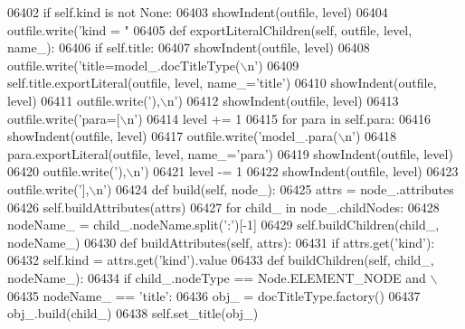 \begin{DoxyCode}
{{{{{{{{{{{{{{{{{{{{{{{{{{{{{{{{{{{{{{{{{{{{{{{{{{{{{{{{{{{{{{{{{{{{{{{{{{{{{{{{{{{{{{{{{{{{{{{{{{{{{{{{{{{{{{{{{{{{{{{{{{{{{{{{{{{{{{{{{{{{{{{{{{{{{{{{{{{{{{{{{{{{{{{{{{{{{{{{{{{{{{{{{{{{{{{{{{{{{{{{{{{{{{{{{{{{{{{{{{{{{{{{{{{{{{{{{{{{{{{{{{{{{{{{{{{{{{{{{{{{{{{{{{{{{{{{{{{{{{{{{{{{{{{{{{{{{{{{{{{{{{{{{{{{{{{{{{{{{{{{{{{{{{{{{{{{{{{{{{{{{{{{{{{{{{{{{{{{{{{{{{{{{{{{{{{{{{{{{{{{{{{{{{{{{{{{{{{06402         \textcolor{keywordflow}{if} self.kind \textcolor{keywordflow}{is} \textcolor{keywordflow}{not} \textcolor{keywordtype}{None}:
06403             showIndent(outfile, level)
06404             outfile.write(\textcolor{stringliteral}{'kind = "%
06405     \textcolor{keyword}{def }exportLiteralChildren(self, outfile, level, name\_):
06406         \textcolor{keywordflow}{if} self.title:
06407             showIndent(outfile, level)
06408             outfile.write(\textcolor{stringliteral}{'title=model\_.docTitleType(\(\backslash\)n'})
06409             self.title.exportLiteral(outfile, level, name\_=\textcolor{stringliteral}{'title'})
06410             showIndent(outfile, level)
06411             outfile.write(\textcolor{stringliteral}{'),\(\backslash\)n'})
06412         showIndent(outfile, level)
06413         outfile.write(\textcolor{stringliteral}{'para=[\(\backslash\)n'})
06414         level += 1
06415         \textcolor{keywordflow}{for} para \textcolor{keywordflow}{in} self.para:
06416             showIndent(outfile, level)
06417             outfile.write(\textcolor{stringliteral}{'model\_.para(\(\backslash\)n'})
06418             para.exportLiteral(outfile, level, name\_=\textcolor{stringliteral}{'para'})
06419             showIndent(outfile, level)
06420             outfile.write(\textcolor{stringliteral}{'),\(\backslash\)n'})
06421         level -= 1
06422         showIndent(outfile, level)
06423         outfile.write(\textcolor{stringliteral}{'],\(\backslash\)n'})
06424     \textcolor{keyword}{def }build(self, node\_):
06425         attrs = node\_.attributes
06426         self.buildAttributes(attrs)
06427         \textcolor{keywordflow}{for} child\_ \textcolor{keywordflow}{in} node\_.childNodes:
06428             nodeName\_ = child\_.nodeName.split(\textcolor{stringliteral}{':'})[-1]
06429             self.buildChildren(child\_, nodeName\_)
06430     \textcolor{keyword}{def }buildAttributes(self, attrs):
06431         \textcolor{keywordflow}{if} attrs.get(\textcolor{stringliteral}{'kind'}):
06432             self.kind = attrs.get(\textcolor{stringliteral}{'kind'}).value
06433     \textcolor{keyword}{def }buildChildren(self, child\_, nodeName\_):
06434         \textcolor{keywordflow}{if} child\_.nodeType == Node.ELEMENT\_NODE \textcolor{keywordflow}{and} \(\backslash\)
06435             nodeName\_ == \textcolor{stringliteral}{'title'}:
06436             obj\_ = docTitleType.factory()
06437             obj\_.build(child\_)
06438             self.set_title(obj\_)
}}}}}}}}}}}}}}}}}}}}}}}}}}}}}}}}}}}}}}}}}}}}}}}}}}}}}}}}}}}}}}}}}}}}}}}}}}}}}}}}}}}}}}}}}}}}}}}}}}}}}}}}}}}}}}}}}}}}}}}}}}}}}}}}}}}}}}}}}}}}}}}}}}}}}}}}}}}}}}}}}}}}}}}}}}}}}}}}}}}}}}}}}}}}}}}}}}}}}}}}}}}}}}}}}}}}}}}}}}}}}}}}}}}}}}}}}}}}}}}}}}}}}}}}}}}}}}}}}}}}}}}}}}}}}}}}}}}}}}}}}}}}}}}}}}}}}}}}}}}}}}}}}}}}}}}}}}}}}}}}}}}}}}}}}}}}}}}}}}}}}}}}}}}}}}}}}}}}}}}}}}}}}}}}}}}}}}}}}}}}}}}}}}}}}}}}}}}}
\end{DoxyCode}
